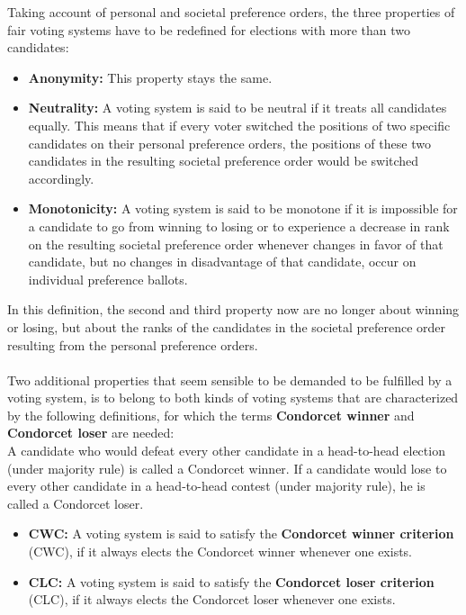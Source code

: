 Taking account of personal and societal preference orders, the three properties of fair voting systems have to be redefined for elections with more than two candidates: 
\begin{itemize}
\item \textbf{Anonymity:} This property stays the same.  
\item \textbf{Neutrality:} A voting system is said to be neutral if it treats all candidates equally. This means that if every voter switched the positions of two specific candidates on their personal preference orders, the positions of these two candidates in the resulting societal preference order would be switched accordingly. 
\item\textbf{Monotonicity:} A voting system is said to be monotone if it is impossible for a candidate to go from winning to losing or to experience a decrease in rank on the resulting societal preference order whenever changes in favor of that candidate, but no changes in disadvantage of that candidate, occur on individual preference ballots. \\
\end{itemize}
In this definition, the second and third property now are no longer about winning or losing, but about the ranks of the candidates in the societal preference order resulting from the personal preference orders. \\
\\Two additional properties that seem sensible to be demanded to be fulfilled by a voting system, is to belong to both kinds of voting systems that are characterized by the following definitions, for which the terms {\textbf{Condorcet winner} and \textbf{Condorcet loser}} are needed: \\
A candidate who would defeat every other candidate in a head-to-head election (under majority rule) is called a Condorcet winner. If a candidate would lose to every other candidate in a head-to-head contest (under majority rule), he is called a Condorcet loser. 
\begin{itemize}
\item \textbf{CWC:} A voting system is said to satisfy the {\textbf{Condorcet winner criterion}} (CWC), if it always elects the Condorcet winner whenever one exists.
\item \textbf{CLC:} A voting system is said to satisfy the {\textbf{Condorcet loser criterion }} (CLC), if it always elects the Condorcet loser whenever one exists. 
\end{itemize}
